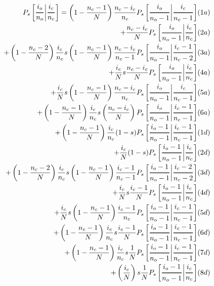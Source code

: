 \documentclass[preview]{standalone}
\newcommand{\Dfrac}[2]{%
  \ooalign{%
    $\genfrac{}{}{1.2pt}0{#1}{#2}$\cr%
    $\color{white}\genfrac{}{}{.4pt}0{\phantom{#1}}{\phantom{#2}}$}%
}
\newcommand{\cond}{\middle\vert}
\begin{document}
\begin{equation*}
  \begin{aligned}
    P_s\left[ \Dfrac{i_o}{n_o} \cond \Dfrac{i_c}{n_c} \right]
    = \left(1-\frac{n_c-1}{N}\right)\frac{n_c-i_c}{n_c} P_s\left[ \Dfrac{i_o}{n_o-1} \cond
      \Dfrac{i_c}{n_c-1} \right]& (1a)\\ %
      + \frac{n_c-i_c}{N} P_s\left[ \Dfrac{i_o}{n_o-1} \cond \Dfrac{i_c}{n_c} \right]& (2a)\\ %
    + \left(1-\frac{n_c-2}{N}\right) \frac{i_c}{n_c} s  \left(1-\frac{n_c-1}{N}\right)
      \frac{n_c-i_c}{n_c-1} P_s\left[ \Dfrac{i_o}{n_o-1} \cond \Dfrac{i_c-1}{n_c-2} \right]& (3a) \\ %
    + \frac{i_c}{N} s  \frac{n_c-i_c}{N}  P_s\left[ \Dfrac{i_o}{n_o-1} \cond \Dfrac{i_c}{n_c}
      \right]  &  (4a) \\ %
    + \frac{i_c}{N} s  \left(1-\frac{n_c-1}{N}\right) \frac{n_c-i_c}{n_c}  P_s\left[
        \Dfrac{i_o}{n_o-1} \cond \Dfrac{i_c}{n_c-1} \right]& (5a) \\ %
    + \left(1-\frac{n_c-1}{N}\right) \frac{i_c}{n_c} s  \left(\frac{ n_c-i_c }{N}\right) P_s\left[
        \Dfrac{i_o}{n_o-1} \cond \Dfrac{i_c-1}{n_c-1} \right]& (6a) \\ %
    + \left(1-\frac{n_c-1}{N}\right)\frac{i_c}{n_c} (1-s) P_s\left[ \Dfrac{i_o-1}{n_o-1} \cond
      \Dfrac{i_c-1}{n_c-1} \right]& (1d) \\ %
      + \frac{i_c}{N} (1-s) P_s\left[ \Dfrac{i_o-1}{n_o-1} \cond \Dfrac{i_c}{n_c} \right]& (2d) \\ %
    + \left(1-\frac{n_c-2}{N}\right) \frac{i_c}{n_c} s  \left(1-\frac{n_c-1}{N}\right)
      \frac{i_c-1}{n_c-1} P_s\left[ \Dfrac{i_o-1}{n_o-1} \cond \Dfrac{i_c-2}{n_c-2} \right]& (3d) \\ %
    + \frac{i_c}{N} s  \frac{i_c-1}{N}   P_s\left[ \Dfrac{i_o-1}{n_o-1} \cond \Dfrac{i_c}{n_c}
      \right]& (4d) \\ %
    + \frac{i_c}{N} s  \left(1-\frac{n_c-1}{N}\right) \frac{i_c-1}{n_c}   P_s\left[
        \Dfrac{i_o-1}{n_o-1} \cond \Dfrac{i_c-1}{n_c-1} \right]& (5d) \\ %
    + \left(1-\frac{n_c-1}{N}\right) \frac{i_c}{n_c} s \frac{i_c-1}{N} P_s\left[
        \Dfrac{i_o-1}{n_o-1} \cond \Dfrac{i_c-1}{n_c-1} \right]& (6d) \\ %
    + \left(1-\frac{n_c-1}{N}\right) \frac{i_c}{n_c} s \frac{1}{N} P_s\left[
        \Dfrac{i_o-1}{n_o-1} \cond \Dfrac{i_c-1}{n_c-1} \right]& (7d) \\ %
    + \left(\frac{i_c}{N}\right) s \frac{1}{N} P_s\left[
        \Dfrac{i_o-1}{n_o-1} \cond \Dfrac{i_c}{n_c} \right]& (8d) \\ %
  \end{aligned}
\end{equation*}
\end{document}
